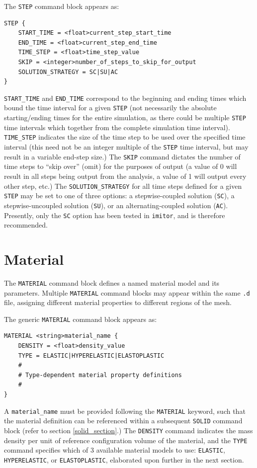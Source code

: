 \documentclass[11pt]{article} %
\begin{document}
The \texttt{STEP} command block appears as:
\begin{lstlisting}
STEP {
	START_TIME = <float>current_step_start_time
	END_TIME = <float>current_step_end_time
	TIME_STEP = <float>time_step_value
	SKIP = <integer>number_of_steps_to_skip_for_output
	SOLUTION_STRATEGY = SC|SU|AC
}
\end{lstlisting}
\texttt{START\_TIME} and \texttt{END\_TIME} correspond to the beginning and ending times which bound the time interval for a given \texttt{STEP} (not necessarily the absolute starting/ending times for the entire simulation, as there could be multiple \texttt{STEP} time intervals which together from the complete simulation time interval). \texttt{TIME\_STEP} indicates the size of the time step to be used over the specified time interval (this need not be an integer multiple of the \texttt{STEP} time interval, but may result in a variable end-step size.) The \texttt{SKIP} command dictates the number of time steps to ``skip over'' (omit) for the purposes of output (a value of 0 will result in all steps being output from the analysis, a value of 1 will output every other step, etc.) The \texttt{SOLUTION\_STRATEGY} for all time steps defined for a given \texttt{STEP} may be set to one of three options: a stepwise-coupled solution (\texttt{SC}), a stepwise-uncoupled solution (\texttt{SU}), or an alternating-coupled solution (\texttt{AC}). Presently, only the \texttt{SC} option has been tested in \texttt{imitor}, and is therefore recommended.

\section{Material} The \texttt{MATERIAL} command block defines a named material model and its parameters. Multiple \texttt{MATERIAL} command blocks may appear within the same \texttt{.d} file, assigning different material properties to different regions of the mesh.

The generic \texttt{MATERIAL} command block appears as:
\begin{lstlisting}
MATERIAL <string>material_name {
	DENSITY = <float>density_value
	TYPE = ELASTIC|HYPERELASTIC|ELASTOPLASTIC
	# 
	# Type-dependent material property definitions
	#
}
\end{lstlisting}
A \texttt{material\_name} must be provided following the \texttt{MATERIAL} keyword, such that the material definition can be referenced within a subsequent \texttt{SOLID} command block (refer to section \ref{solid_section}.) The \texttt{DENSITY} command indicates the mass density per unit of reference configuration volume of the material, and the \texttt{TYPE} command specifies which of 3 available material models to use: \texttt{ELASTIC}, \texttt{HYPERELASTIC}, or \texttt{ELASTOPLASTIC}, elaborated upon further in the next section.
\end{document}
